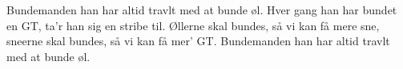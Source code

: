 
Bundemanden han har altid travlt
med at bunde øl.
Hver gang han har bundet en GT,
ta'r han sig en stribe til.
Øllerne skal bundes, så vi kan få mere sne,
sneerne skal bundes, så vi kan få mer' GT.
Bundemanden han har altid travlt
med at bunde øl.


